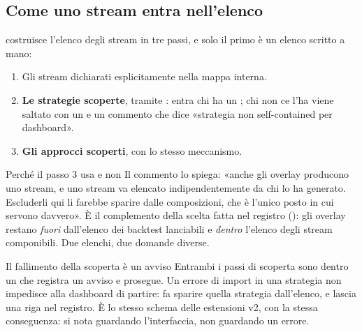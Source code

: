 \subsection{Come uno stream entra nell'elenco}

 costruisce l'elenco degli stream in tre passi, e
solo il primo è un elenco scritto a mano:

\begin{enumerate}
  \item Gli stream dichiarati esplicitamente nella mappa interna.
  \item \textbf{Le strategie scoperte}, tramite
        : entra chi ha un
        ; chi non ce l'ha viene saltato con un
         e un commento che dice «strategia non self-contained
        per dashboard».
  \item \textbf{Gli approcci scoperti}, con lo stesso meccanismo.
\end{enumerate}

\begin{perche}{Perché il passo 3 usa  e non }
Il commento lo spiega: «anche gli overlay producono uno stream, e uno stream
va elencato indipendentemente da chi lo ha generato. Escluderli qui li
farebbe sparire dalle composizioni, che è l'unico posto in cui servono
davvero». È il complemento della scelta fatta nel registro
(): gli overlay restano \emph{fuori} dall'elenco dei
backtest lanciabili e \emph{dentro} l'elenco degli stream componibili. Due
elenchi, due domande diverse.
\end{perche}

\begin{attenzione}{Il fallimento della scoperta è un avviso}
Entrambi i passi di scoperta sono dentro un  che registra un
avviso e prosegue. Un errore di import in una strategia non impedisce alla
dashboard di partire: fa sparire quella strategia dall'elenco, e lascia una
riga  nel registro. È lo stesso
schema delle estensioni v2, con la stessa conseguenza: si nota guardando
l'interfaccia, non guardando un errore.
\end{attenzione}

